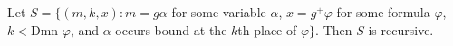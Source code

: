Let $S = \{(m, k, x) : m = g\alpha$ for some variable $\alpha$, $x = g^+\varphi$ for some formula $\varphi$, $k < \text{Dmn }\varphi$, and $\alpha$ occurs bound at the $k$th place of $\varphi\}$. Then $S$ is recursive.
